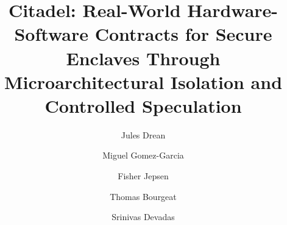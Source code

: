 \documentclass[nonacm,sigplan]{acmart}
\begin{document}
\title{Citadel: Real-World Hardware-Software Contracts for Secure Enclaves Through Microarchitectural Isolation and Controlled Speculation}

\author{Jules Drean}

\author{Miguel Gomez-Garcia}  

\author{Fisher Jepsen}  

\author{Thomas Bourgeat}  

\author{Srinivas Devadas}



\maketitle %
\pagestyle{plain} %














%
\end{document}
